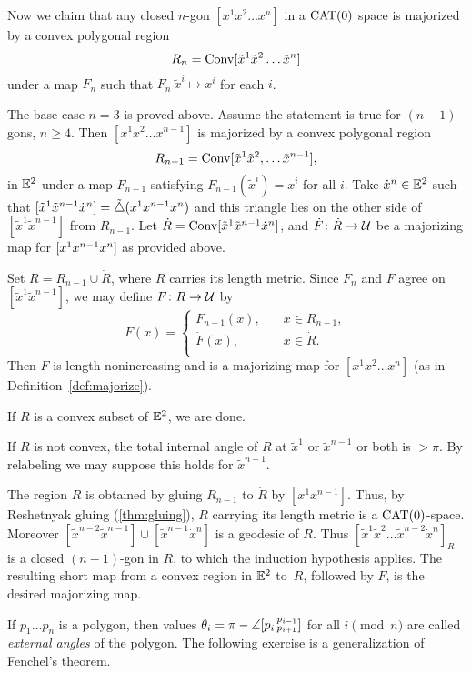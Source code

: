 Now we claim that any closed $n$-gon $[x^1x^2 \dots x^n ]$ in a $\mathrm{CAT}(0)$ space  is majorized by a convex polygonal region \[R_n=\mathop{\rm Conv}\nolimits[\tilde x^1\tilde x^2\dots\tilde x^n]\]
under a map $F_n$ such that $F_n\:\tilde x^i\mapsto x^i$ for each $i$. 

The base case $n=3$ is proved above.
Assume the statement is true for $(n-1)$-gons, $n\ge 4$.  
Then  $[x^1 x^2 \dots x^{n-1}]$  is majorized by a convex polygonal region 
\[R_{n-1}=\mathop{\rm Conv}\nolimits[\tilde x^1 \tilde x^2,\dots \tilde x^{n-1}],\] 
in $\mathbb{E}^2$ under a map $F_{n-1}$ satisfying $F_{n-1}(\tilde x^i)=x^i$ for all $i$. 
Take $\dot x^n\in\mathbb{E}^2$ such that $[\tilde x^1\tilde x^{n-1}\dot x^n]=\tilde\triangle(x^1 x^{n-1} x^n)$ 
and this triangle lies on the other side of $[\tilde x^1\tilde x^{n-1}]$ from $R_{n-1}$.  
Let $\dot R\z=\Conv\trig{\tilde x^1}{\tilde x^{n-1}}{\dot x^n}$, 
and $\dot F\colon\dot R\to \mathcal{U}$ be a majorizing map for $[ x^1x^{n-1} x^n]$ as provided above.

Set 
$R= R_{n-1}\cup \dot R$, where $R$ carries its length metric.
Since $F_n$ and $F$ agree on $[\tilde x^1 \tilde x^{n-1}]$, we may define $F\colon R\to\mathcal{U}$ by 
\[
F(x)=
\begin{cases}
F_{n-1}(x),\quad & x\in R_{n-1},\\
\dot F(x),\quad & x\in \dot R.\\
\end{cases}
\]
Then $F$ is length-nonincreasing and is a majorizing map for $[x^1 x^2 \dots x^n ]$ (as in Definition~\ref{def:majorize}).

If $R$ is a convex subset of $\mathbb{E}^2$, we are done. 

If $R$ is not convex,  the total internal angle of $R$ at $\tilde x^1$ or $ \tilde x^{n-1} $ or both is $>\pi$.  
By relabeling we may suppose this holds for $\tilde x^{n-1}$.  

The region $R$ is obtained by gluing $R_{n-1}$ to $\dot R$ by $[x^1x^{n-1}]$.
Thus, by Reshetnyak gluing (\ref{thm:gluing}), $R$ carrying its length metric is a $\mathrm{CAT}(0)$-space.  
Moreover $[\tilde x^{n-2}\tilde x^{n-1}]\cup[\tilde x^{n-1} \dot x^n]$ is a geodesic of $R$.
Thus $[\tilde x^1 \tilde x^2 \dots \tilde x^{n-2} \dot x^n]_R$ is a closed $(n-1)$-gon in $R$, to which the induction hypothesis applies. The resulting short map from a convex region in $ \mathbb{E}^2$ to~$R$, followed by $F$,  is the desired majorizing map.
\qeds

If $p_1\dots p_n$ is a polygon, then values $\theta_i=\pi-\measuredangle[p_i\,{}^{p_{i-1}}_{p_{i+1}}]$ for all $i\pmod n$ are called \emph{external angles} of the polygon.
The following exercise is a generalization of Fenchel's theorem.

